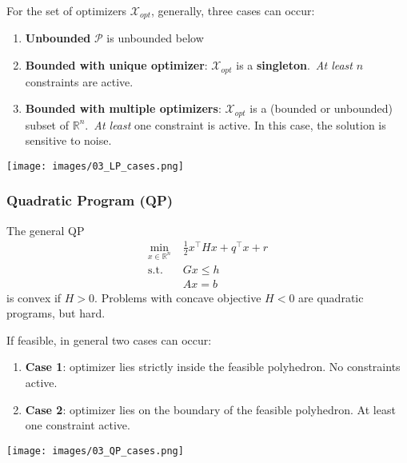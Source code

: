\newpar{}
For the set of optimizers $\mathcal{X}_{opt}$, generally, three cases can occur:
\begin{enumerate}
    \item \textbf{Unbounded} $\mathcal{P}$ is unbounded below
    \item \textbf{Bounded with unique optimizer}: $\mathcal{X}_{opt}$ is a \textbf{singleton}.\ \textit{At least} $n$ constraints are active.
    \item \textbf{Bounded with multiple optimizers}: $\mathcal{X}_{opt}$ is a (bounded or unbounded) subset of $\mathbb{R}^n$.\ \textit{At least} one constraint is active. In this case, the solution is sensitive to noise. %
\end{enumerate}
\begin{center}
    \texttt{[image: images/03\_LP\_cases.png]}
\end{center}

\subsubsection{Quadratic Program (QP)}\label{optimizer_location_QP}
The general QP
\begin{align*}
    \min_{x\in\mathbb{R}^n}\; & \frac{1}{2}x^\top H x + q^\top x + r \\
    \mathrm{s.t.}\;           & Gx \leq h                            \\
                              & Ax = b
\end{align*}
is convex if $H>0$.
\newpar{}
Problems with concave objective $H<0$ are quadratic programs, but hard.

\newpar{}
If feasible, in general two cases can occur:
\begin{enumerate}
    \item \textbf{Case 1}: optimizer lies strictly inside the feasible polyhedron. No constraints active.
    \item \textbf{Case 2}: optimizer lies on the boundary of the feasible polyhedron. At least one constraint active.
\end{enumerate}
\begin{center}
    \texttt{[image: images/03\_QP\_cases.png]}
\end{center}

